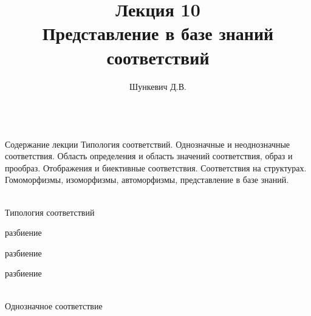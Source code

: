 \documentclass{beamer}
\title{Лекция 10\\Представление в базе знаний соответствий}
\author[]{Шункевич Д.В.}
\institute[]{Белорусский государственный университет информатики и радиоэлектроники}
\begin{document}
\begin{frame}
	\titlepage
\end{frame}

\begin{frame}{\\Содержание лекции}
	\topline
	\justifying
	Типология соответствий. Однозначные и неоднозначные соответствия. Область определения и область значений соответствия, образ и прообраз. Отображения и биективные соответствия. Соответствия на структурах. Гомоморфизмы, изоморфизмы, автоморфизмы, представление в базе знаний.
\end{frame}

\begin{frame}{\\Типология соответствий}
\topline
\begin{SCn}
\begin{scnrelfromset}{разбиение}
\end{scnrelfromset}
\begin{scnrelfromset}{разбиение}
\end{scnrelfromset}
\begin{scnrelfromset}{разбиение}
\end{scnrelfromset}
\end{SCn}
\end{frame}

\begin{frame}{\\Однозначное соответствие}
\topline
\begin{SCn}
\end{SCn}
\end{frame}
\end{document}
